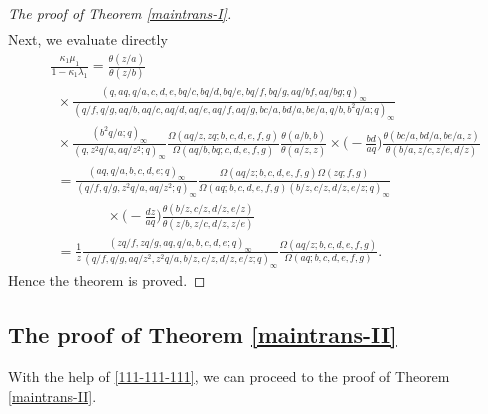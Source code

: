 \documentclass[xits,review,sort&compress]{elsarticle}
\numberwithin{equation}{section}
\newcommand{\poq}[2]{(#1;q)_{#2}}
\begin{document}
\begin{proof}[The proof of Theorem \ref{maintrans-I}]
\begin{align*}
\end{align*}
Next,  we evaluate  directly
\begin{align*}
&\frac{\kappa_1\mu_1}{1-\kappa_1\lambda_1}=\frac{\theta\left(z/a\right)}
{\theta\left(z/b\right)}\\&~~\times\frac{(q, aq, q / a, c, d, e, bq/ c, bq/ d, bq/ e, bq/ f, bq/ g, aq / b f, aq / b g ; q)_{\infty}}{\left(q / f, q / g, aq / b, aq / c, aq / d, aq / e, aq / f, aq / g, b c / a, b d / a, b e / a, q / b, b^{2}q / a ; q\right)_{\infty}}\\
&~~\times \frac{\poq{b^2 q/a}{\infty}}{\poq{q,z^2q/a,aq/z^2}{\infty}}
\frac{\Omega(aq/z,zq;b,c,d,e,f,g)}{\Omega(aq/b,bq;c,d,e,f,g)} \frac{\theta(a/b,b)}{\theta(a/z,z)}\times\bigg(-\frac{bd}{aq}\bigg)
\frac{\theta(bc/a,bd/a,be/a,z)}{\theta\left(b/a,z/c, z/e,d/z\right)}\\
&~~=\frac{(aq, q / a,b, c, d, e; q)_{\infty}}{\left(q/f, q/g,z^2q/a,aq/z^2; q\right)_{\infty}}\frac{\Omega(aq/z;b,c,d,e,f,g)\Omega(zq;f,g)}{\Omega( aq; b,  c, d,  e, f, g)\left(b/z,c/z,d/z,e/z;q\right)_\infty}\\
&\qquad\qquad\times\bigg(-\frac{dz}{aq}\bigg)\frac{\theta\left(b/z,c/z,d/z,e/z\right)}{\theta\left(z/b,z/c,d/z,z/e\right)}\\
&~~=\frac{1}{z}\frac{(zq/f,zq/g,aq, q / a,b, c, d, e; q)_{\infty}}
{\left(q /f, q/g,aq/z^2,z^2q/a,b/z,c/z,d/z,e/z;q\right)_{\infty}}
\frac{\Omega(aq/z;b,c,d,e,f,g)}{\Omega(aq; b,  c, d,  e, f, g)}.
\end{align*}
Hence the theorem  is  proved.
\end{proof}

\subsection{The  proof of Theorem \ref{maintrans-II}}

With the help of  \eqref{111-111-111}, we can proceed to the proof of Theorem  \ref{maintrans-II}.
\end{document}
